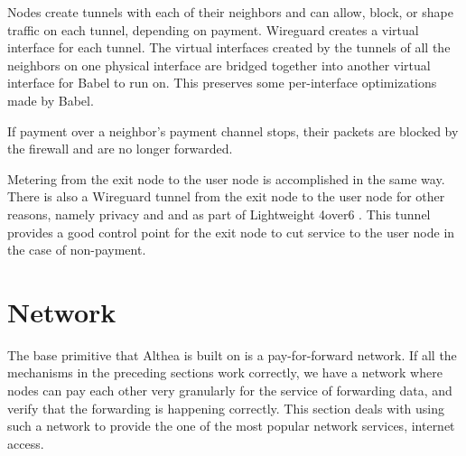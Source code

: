 \documentclass[11pt]{article}
\newlength{\currentparskip}
\newenvironment{unbreakable}
  {\setlength{\currentparskip}{\parskip}%
	 \vspace{\currentparskip}
   \begin{minipage}{\textwidth}%
   \setlength{\parskip}{\currentparskip}%
  }
  {\end{minipage}\vspace{\currentparskip}}
\begin{document}
\begin{unbreakable}
\begin{figure}
\end{figure}

Nodes create tunnels with each of their neighbors and can allow, block, or shape traffic on each tunnel, depending on payment. Wireguard creates a virtual interface for each tunnel. The virtual interfaces created by the tunnels of all the neighbors on one physical interface are bridged together into another virtual interface for Babel to run on. This preserves some per-interface optimizations made by Babel.

If payment over a neighbor’s payment channel stops, their packets are blocked by the firewall and are no longer forwarded.
\end{unbreakable}

Metering from the exit node to the user node is accomplished in the same way. There is also a Wireguard tunnel from the exit node to the user node for other reasons, namely privacy and and as part of Lightweight 4over6 \cite{4over6}. This tunnel provides a good control point for the exit node to cut service to the user node in the case of non-payment. 

\section{Network}
\label{sec:network}
The base primitive that Althea is built on is a pay-for-forward network. If all the mechanisms in the preceding sections work correctly, we have a network where nodes can pay each other very granularly for the service of forwarding data, and verify that the forwarding is happening correctly. This section deals with using such a network to provide the one of the most popular network services, internet access.

\begin{figure}[h]
\end{figure}
\end{document}
